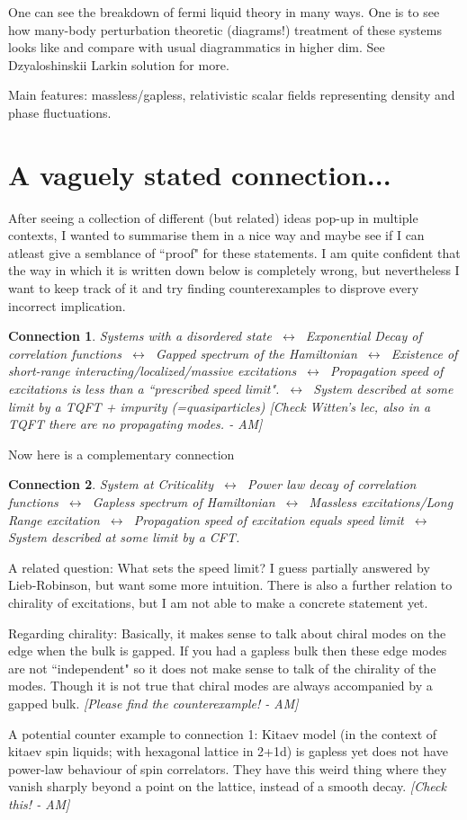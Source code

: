 \documentclass{article}
\newcommand\AM[1]{{\it \color{darkblue}  [#1 - AM]}}
\newtheorem{conn}{Connection}
\begin{document}
One can see the breakdown of fermi liquid theory in many ways. One is to see how many-body perturbation theoretic (diagrams!) treatment of these systems looks like and compare with usual diagrammatics in higher dim. See Dzyaloshinskii Larkin solution for more. \cite{sadovskii2006diagrammatics, giamarchi2003quantum}

Main features: massless/gapless, relativistic scalar fields representing density and phase fluctuations. 
\section{A vaguely stated connection...}
After seeing a collection of different (but related) ideas pop-up in multiple contexts, I wanted to summarise them in a nice way and maybe see if I can atleast give a semblance of ``proof" for these statements. I am quite confident that the way in which it is written down below is completely wrong, but nevertheless I want to keep track of it and try finding counterexamples to disprove every incorrect implication.

\begin{conn}
    Systems with a disordered state $~\longleftrightarrow~$ Exponential Decay of correlation functions 
    $~\longleftrightarrow~$ Gapped spectrum of the Hamiltonian
    $~\longleftrightarrow~$ Existence of short-range interacting/localized/massive excitations
    $~\longleftrightarrow~$ Propagation speed of excitations is less than a ``prescribed speed limit".
    $~\longleftrightarrow~$ System described at some limit by a TQFT + impurity (=quasiparticles) \AM{Check Witten's lec, also in a TQFT there are no propagating modes.}
\end{conn}

Now here is a complementary connection
\begin{conn}
    System at Criticality 
    $~\longleftrightarrow~$ Power law decay of correlation functions
    $~\longleftrightarrow~$ Gapless spectrum of Hamiltonian
    $~\longleftrightarrow~$ Massless excitations/Long Range excitation
    $~\longleftrightarrow~$ Propagation speed of excitation equals speed limit
    $~\longleftrightarrow~$ System described at some limit by a CFT.
\end{conn}
A related question: What sets the speed limit? I guess partially answered by Lieb-Robinson, but want some more intuition. There is also a further relation to chirality of excitations, but I am not able to make a concrete statement yet.

Regarding chirality: Basically, it makes sense to talk about chiral modes on the edge when the bulk is gapped. If you had a gapless bulk then these edge modes are not ``independent" so it does not make sense to talk of the chirality of the modes. Though it is not true that chiral modes are always accompanied by a gapped bulk.\AM{Please find the counterexample!}

A potential counter example to connection 1: Kitaev model (in the context of kitaev spin liquids; with hexagonal lattice in 2+1d) is gapless yet does not have power-law behaviour of spin correlators. They have this weird thing where they vanish sharply beyond a point on the lattice, instead of a smooth decay.\AM{Check this!}


\end{document}
